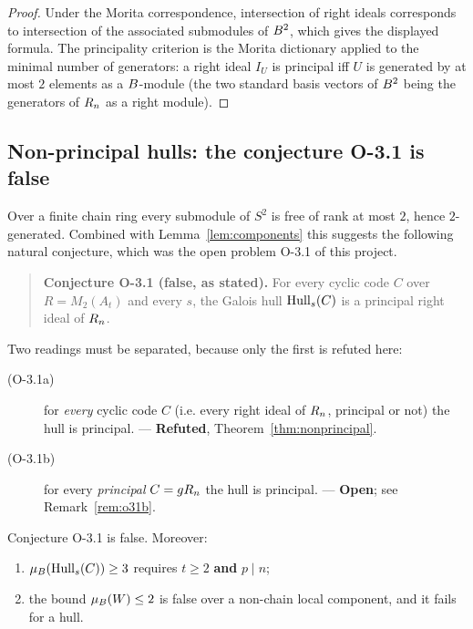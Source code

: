 \begin{proof}
Under the Morita correspondence, intersection of right ideals corresponds to
intersection of the associated submodules of $B^2$, which gives the displayed
formula. The principality criterion is the Morita dictionary applied to the
minimal number of generators: a right ideal $I_U$ is principal iff $U$ is
generated by at most $2$ elements as a $B$-module (the two standard basis
vectors of $B^2$ being the generators of $R_n$ as a right module).
\end{proof}

\subsection{Non-principal hulls: the conjecture O-3.1 is false}

Over a finite chain ring every submodule of $S^2$ is free of rank at most $2$,
hence $2$-generated. Combined with Lemma~\ref{lem:components} this suggests the
following natural conjecture, which was the open problem O-3.1 of this project.

\begin{quote}\textbf{Conjecture O-3.1 (false, as stated).} For every cyclic
code $C$ over $R=M_2(A_t)$ and every $s$, the Galois hull $\operatorname{Hull}_s(C)$ is a
principal right ideal of $R_n$.
\end{quote}

Two readings must be separated, because only the first is refuted here:
\begin{description}
\item[(O-3.1a)] for \emph{every} cyclic code $C$ (i.e. every right ideal of
  $R_n$, principal or not) the hull is principal. --- \textbf{Refuted},
  Theorem~\ref{thm:nonprincipal}.
\item[(O-3.1b)] for every \emph{principal} $C=gR_n$ the hull is principal.
  --- \textbf{Open}; see Remark~\ref{rem:o31b}.
\end{description}

\begin{theorem}\label{thm:nonprincipal}
Conjecture O-3.1 is false. Moreover:
\begin{enumerate}[label=\textnormal{(\alph*)},leftmargin=*]
\item $\mu_{B}(\operatorname{Hull}_s(C))\ge3$ requires $t\ge2$ \textbf{and} $p\mid n$;
\item the bound $\mu_{B}(W)\le2$ is false over a non-chain local
  component, and it fails for a hull.
\end{enumerate}
\end{theorem}

